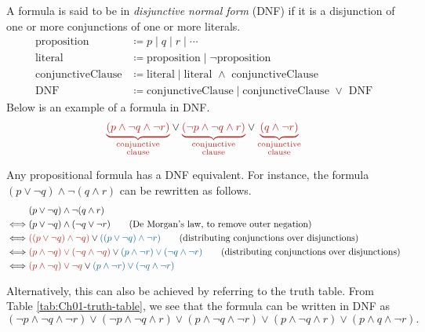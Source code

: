 A formula is said to be in \emph{disjunctive normal form} (DNF) if it is a disjunction of one or more conjunctions of one or more literals.
%
\begin{align*}
    \text{proposition} &\coloneq p \;\vert\; q \;\vert\; r \;\vert\; \cdots\\
    \text{literal} &\coloneq \text{proposition} \;\vert\; \neg\text{proposition}\\
    \text{conjunctiveClause} &\coloneq \text{literal} \;\vert\; \text{literal } \land \text{ conjunctiveClause}\\
    \text{DNF} &\coloneq \text{conjunctiveClause} \;\vert\; \text{conjunctiveClause } \lor \text{ DNF}
\end{align*}
%
Below is an example of a formula in DNF.
%
\[
    {\color{BrickRed}\underbrace{(p \land \neg q \land \neg r)}_{\substack{\text{conjunctive}\\\text{clause}}}}
    \lor
    {\color{BrickRed}\underbrace{(\neg p \land \neg q \land r)}_{\substack{\text{conjunctive}\\\text{clause}}}}
    \lor
    {\color{BrickRed}\underbrace{(q \land \neg r)}_{\substack{\text{conjunctive}\\\text{clause}}}}
\]

Any propositional formula has a DNF equivalent. For instance, the formula \((p \lor \neg q) \land \neg (q \land r)\) can be rewritten as follows.
%
\begin{align*}
    & (p \lor \neg q) \land \neg (q \land r)\\
    \iff & (p \lor \neg q) \land (\neg q \lor \neg r) \tag{De Morgan's law, to remove outer negation}\\
    \iff & {\color{BrickRed}((p \lor \neg q) \land \neg q)} \lor {\color{MidnightBlue}((p \lor \neg q) \land \neg r)} \tag{distributing conjunctions over disjunctions}\\
    \iff & {\color{BrickRed}(p \land \neg q) \lor (\neg q \land \neg q)} \lor {\color{MidnightBlue}(p \land \neg r) \lor (\neg q \land \neg r)} \tag{distributing conjunctions over disjunctions}\\
    \iff & {\color{BrickRed}(p \land \neg q) \lor \neg q} \lor {\color{MidnightBlue}(p \land \neg r) \lor (\neg q \land \neg r)}
\end{align*}

Alternatively, this can also be achieved by referring to the truth table. From Table \ref{tab:Ch01-truth-table}, we see that the formula can be written in DNF as
%
\[(\neg p \land \neg q \land \neg r) \lor (\neg p \land \neg q \land r) \lor (p \land \neg q \land \neg r)  \lor (p \land \neg q \land r)  \lor (p \land q \land \neg r)\text{.}\]



